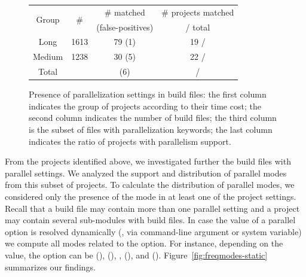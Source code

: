 \begin{figure}[ht!]
    \centering
    \begin{tabular*}{0.48\textwidth}{@{\extracolsep{\fill}}cccc}
        \toprule
        \multirow{2}{*}{Group} %
            & \multirow{2}{*}{\# \pomf{}}
            & \# \pomf{} matched
            & \# projects matched\\%
            & %
            & (false-positives)
            & / total\\%
        \midrule%
        Long   & 1613 & 79 (1) & 19 / \numLong{}\\%
        Medium & 1238 & 30 (5) & 22 / \numMed{}\\%
        \midrule%
        Total %
            & \pomMedLong{}
            & \numPomMatched{} (6)
            & \numProjectsPar{} / \numMedLong{}\\%
        \bottomrule%
    \end{tabular*}
    \caption{Presence of parallelization settings in build files: the
    first column indicates the group of projects according to their
    time cost; the second column indicates the number of build files;
    the third column is the subset of files with parallelization
    keywords; the last column indicates the ratio of projects with
    parallelism support.}
    \label{tab:inspection-table} 
\end{figure}

 From the \numProjectsPar{} projects
identified above, we investigated further the \numPomMatchedValid{}
build files with parallel settings.  We analyzed the support and
distribution of parallel modes from this subset of projects. To
calculate the distribution of parallel modes, we considered only the
presence of the mode in at least one of the project settings.  Recall
that a build file may contain more than one parallel setting and a
project may contain several sub-modules with build files.  In case the
value of a parallel option is resolved dynamically (\eg, via
command-line argument or system variable) we compute all modes related
to the option. For instance, depending on the value, the
 option can be \Seq{} (),
\ParClassSeqMeth{} (), \SeqClassParMeth{},
(), and \ParClassParMeth{} ().
Figure~\ref{fig:freqmodes-static} summarizes our findings.

